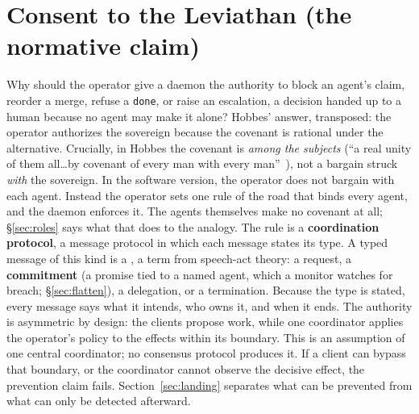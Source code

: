 \documentclass[11pt,a4paper]{article}
\theoremstyle{definition}
\theoremstyle{plain}
\newcounter{protocol}[section]
\begin{document}
\section{Consent to the Leviathan (the normative claim)}\label{sec:authority}
Why should the operator give a daemon the authority to block an agent's
claim, reorder a merge, refuse a \texttt{done}, or raise an
escalation, a decision handed up to a human because no agent may
make it alone? Hobbes'
answer, transposed: the operator authorizes the sovereign because the covenant is
rational under the alternative. Crucially, in Hobbes the covenant is \emph{among the
subjects} (``a real unity of them all\ldots by covenant of every man with every
man''~), not a bargain struck \emph{with} the
sovereign. In the software version, the operator does not bargain with each
agent. Instead the operator sets one rule of the road that binds every agent,
and the daemon enforces it. The agents themselves make no covenant at all;
\S\ref{sec:roles} says what that does to the analogy. The rule is a \textbf{coordination protocol}, a
message protocol in which each message states its type. A typed message of
this kind is a , a term from speech-act theory: a
request, a \textbf{commitment} (a promise tied to a named agent, which a
monitor watches for breach; \S\ref{sec:flatten}), a delegation, or a
termination. Because the type is stated, every message says what it intends,
who owns it, and when it ends.
The authority is asymmetric by design: the clients propose work, while one
coordinator applies the operator's policy to the effects within its boundary.
This is an assumption of one central coordinator; no consensus protocol
produces it. If a client
can bypass that boundary, or the coordinator cannot observe the decisive effect,
the prevention claim fails. Section~\ref{sec:landing} separates what can be
prevented from what can only be detected afterward.
\end{document}
